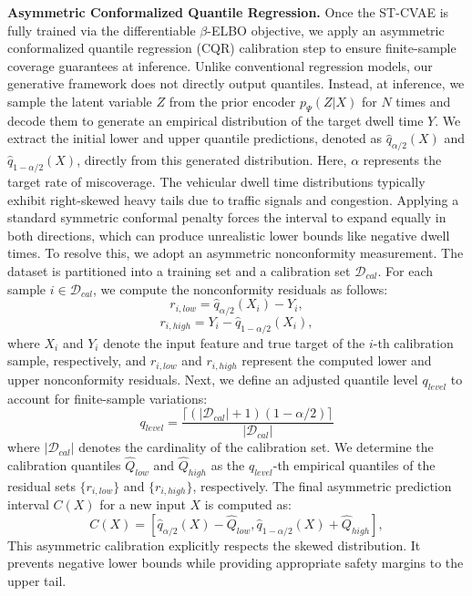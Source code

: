 \documentclass[journal]{IEEEtran}
\begin{document}
\textbf{Asymmetric Conformalized Quantile Regression.}
Once the ST-CVAE is fully trained via the differentiable $\beta$-ELBO objective, we apply an asymmetric conformalized quantile regression (CQR) \cite{x11} calibration step to ensure finite-sample coverage guarantees at inference.
Unlike conventional regression models, our generative framework does not directly output quantiles. Instead, at inference, we sample the latent variable $Z$ from the prior encoder $p_{\Psi}(Z|X)$ for $N$ times and decode them to generate an empirical distribution of the target dwell time $Y$. We extract the initial lower and upper quantile predictions, denoted as $\hat{q}_{\alpha/2}(X)$ and $\hat{q}_{1-\alpha/2}(X)$, directly from this generated distribution. Here, $\alpha$ represents the target rate of miscoverage.
The vehicular dwell time distributions typically exhibit right-skewed heavy tails due to traffic signals and congestion. Applying a standard symmetric conformal penalty forces the interval to expand equally in both directions, which can produce unrealistic lower bounds like negative dwell times. To resolve this, we adopt an asymmetric nonconformity measurement. The dataset is partitioned into a training set and a calibration set $\mathcal{D}_{cal}$. For each sample $i\in\mathcal{D}_{cal}$, we compute the nonconformity residuals as follows:
\begin{equation}
    r_{i,low}=\hat{q}_{\alpha/2}(X_{i})-Y_{i},
\end{equation}
\begin{equation}
    r_{i,high}=Y_{i}-\hat{q}_{1-\alpha/2}(X_{i}),
\end{equation}
where $X_{i}$ and $Y_{i}$ denote the input feature and true target of the $i$-th calibration sample, respectively, and $r_{i,low}$ and $r_{i,high}$ represent the computed lower and upper nonconformity residuals.
Next, we define an adjusted quantile level $q_{level}$ to account for finite-sample variations:
\begin{equation}
    q_{level}=\frac{\lceil(|\mathcal{D}_{cal}|+1)(1-\alpha/2)\rceil}{|\mathcal{D}_{cal}|}
\end{equation}
where $|\mathcal{D}_{cal}|$ denotes the cardinality of the calibration set. We determine the calibration quantiles $\hat{Q}_{low}$ and $\hat{Q}_{high}$ as the $q_{level}$-th empirical quantiles of the residual sets $\{r_{i,low}\}$ and $\{r_{i,high}\}$, respectively. The final asymmetric prediction interval $C(X)$ for a new input $X$ is computed as:
\begin{equation}
    C(X)=[\hat{q}_{\alpha/2}(X)-\hat{Q}_{low}, \hat{q}_{1-\alpha/2}(X)+\hat{Q}_{high}],
\end{equation}
This asymmetric calibration explicitly respects the skewed distribution. It prevents negative lower bounds while providing appropriate safety margins to the upper tail.
\end{document}
